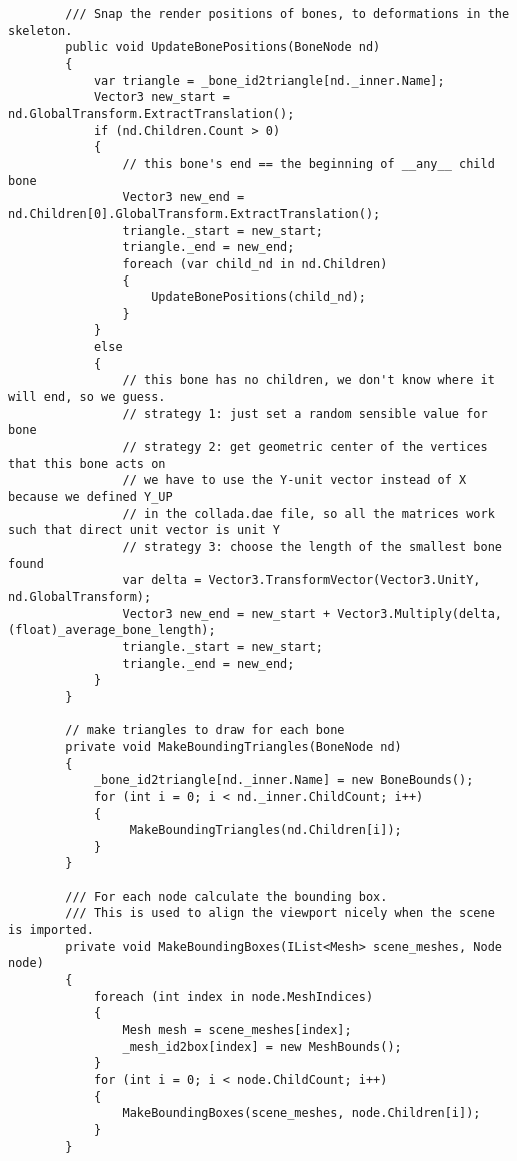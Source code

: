 \begin{scriptsize}
\begin{verbatim}
        /// Snap the render positions of bones, to deformations in the skeleton.
        public void UpdateBonePositions(BoneNode nd)
        {
            var triangle = _bone_id2triangle[nd._inner.Name];
            Vector3 new_start = nd.GlobalTransform.ExtractTranslation();
            if (nd.Children.Count > 0)
            {
                // this bone's end == the beginning of __any__ child bone
                Vector3 new_end = nd.Children[0].GlobalTransform.ExtractTranslation();
                triangle._start = new_start;
                triangle._end = new_end;
                foreach (var child_nd in nd.Children)
                {
                    UpdateBonePositions(child_nd);
                }
            }
            else
            {
                // this bone has no children, we don't know where it will end, so we guess.
                // strategy 1: just set a random sensible value for bone
                // strategy 2: get geometric center of the vertices that this bone acts on
                // we have to use the Y-unit vector instead of X because we defined Y_UP 
                // in the collada.dae file, so all the matrices work such that direct unit vector is unit Y
                // strategy 3: choose the length of the smallest bone found
                var delta = Vector3.TransformVector(Vector3.UnitY, nd.GlobalTransform);
                Vector3 new_end = new_start + Vector3.Multiply(delta, (float)_average_bone_length);
                triangle._start = new_start;
                triangle._end = new_end;
            }
        }

        // make triangles to draw for each bone
        private void MakeBoundingTriangles(BoneNode nd)
        {
            _bone_id2triangle[nd._inner.Name] = new BoneBounds();
            for (int i = 0; i < nd._inner.ChildCount; i++)
            {
                 MakeBoundingTriangles(nd.Children[i]);
            }
        }

        /// For each node calculate the bounding box.
        /// This is used to align the viewport nicely when the scene is imported.
        private void MakeBoundingBoxes(IList<Mesh> scene_meshes, Node node)
        {
            foreach (int index in node.MeshIndices)
            {
                Mesh mesh = scene_meshes[index];
                _mesh_id2box[index] = new MeshBounds();
            }
            for (int i = 0; i < node.ChildCount; i++)
            {
                MakeBoundingBoxes(scene_meshes, node.Children[i]);
            }
        }


\end{verbatim}
\end{scriptsize}

